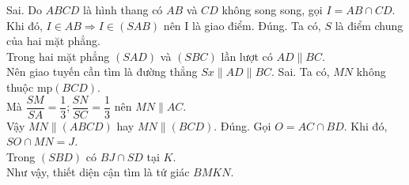 \begin{ex}
{\begin{center}
		\end{center}
		\begin{itemchoice}
			\itemch Sai. Do $ABCD$ là hình thang có $ AB $ và $ CD $ không song song, gọi $I = AB  \cap CD$.\\
			Khi đó, $I \in AB \Rightarrow I \in (SAB)$ nên I là giao điểm.
			\itemch Đúng. Ta có, $S$ là điểm chung của hai mặt phẳng.\\
			Trong hai mặt phẳng $ (SAD) $ và $ (SBC) $ lần lượt có $ AD \parallel BC $.\\
			Nên giao tuyến cần tìm là đường thẳng $ Sx  \parallel  AD  \parallel  BC $.
			\itemch Sai. Ta có, $MN$ không thuộc mp$(BCD)$.\\
			Mà $\dfrac{SM}{SA} = \dfrac{1}{3};\dfrac{SN}{SC} = \dfrac{1}{3}$ nên $ MN \parallel  AC$.\\
			Vậy $ MN \parallel  (ABCD)$ hay $MN \parallel  (BCD)$.
			\itemch Đúng. Gọi $ O=AC \cap BD $. Khi đó, $ SO\cap MN = J  $.\\
			Trong $ (SBD) $ có $ BJ\cap SD $ tại $K$. \\
			Như vậy, thiết diện cận tìm là tứ giác $ BMKN $.
		\end{itemchoice}
		}
\end{ex}

